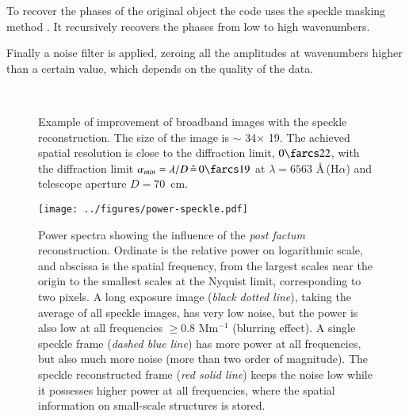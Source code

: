 To recover the phases of the original object the code uses the speckle masking method \citep{1977OptCo..21...55W,1983OptL....8..389W}. It recursively recovers the phases from low to high wavenumbers.

Finally a noise filter is applied, zeroing all the amplitudes at wavenumbers higher than a certain value, which depends on the quality of the data.
\begin{figure}[t]
  \centering
  \quad%
    \\
  \quad%
    \caption{Example of improvement of broadband images with the speckle reconstruction. The size of the image is $\sim$ 34\arcsec $ \times $ 19\arcsec. The achieved spatial resolution is close to the diffraction limit, $ 0\farcs22$, with the diffraction limit $\alpha_{min}=\lambda/D  \, \hat{=}\, 0\farcs19$ at $\lambda=6563$ \AA\,(H$\alpha$) and telescope aperture $D=70$~cm. }
\label{fig:obs:red}

\end{figure}

\begin{figure}[t]
\begin{center}
\texttt{[image: ../figures/power-speckle.pdf]}
\caption{Power spectra showing the influence of the \emph{post factum} reconstruction. Ordinate is the relative power on logarithmic scale, and abscissa is the spatial frequency, from the largest scales near the origin to the smallest scales at the Nyquist limit, corresponding to two pixels. A long exposure image (\emph{black dotted line}), taking the average of all speckle images, has very low noise, but the power is also low at all frequencies $\geqslant 0.8$ Mm$^{-1}$ (blurring effect). A single speckle frame (\emph{dashed blue line}) has more power at all frequencies, but also much more noise (more than two order of magnitude). The speckle reconstructed frame (\emph{red solid line}) keeps the noise low while it possesses higher power at all frequencies, where the spatial information on small-scale structures is stored.}
\label{fig:obs:speckle:power}
\end{center}
\end{figure}
